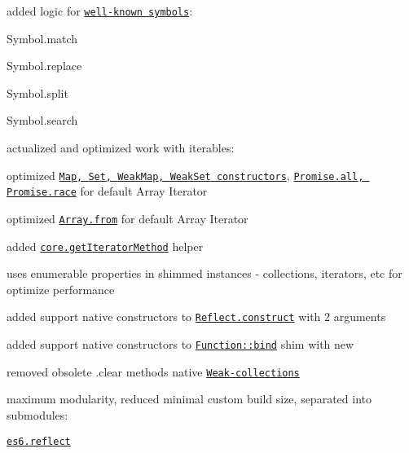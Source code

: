 \begin{DoxyItemize}
\item added logic for \href{https://github.com/zloirock/core-js/#ecmascript-6-regexp}{\tt well-\/known symbols}\+:
\begin{DoxyItemize}
\item {\ttfamily Symbol.\+match}
\item {\ttfamily Symbol.\+replace}
\item {\ttfamily Symbol.\+split}
\item {\ttfamily Symbol.\+search}
\end{DoxyItemize}
\item actualized and optimized work with iterables\+:
\begin{DoxyItemize}
\item optimized \href{https://github.com/zloirock/core-js/#ecmascript-6-collections}{\tt {\ttfamily Map}, {\ttfamily Set}, {\ttfamily Weak\+Map}, {\ttfamily Weak\+Set} constructors}, \href{https://github.com/zloirock/core-js/#ecmascript-6-promise}{\tt {\ttfamily Promise.\+all}, {\ttfamily Promise.\+race}} for default {\ttfamily Array Iterator}
\item optimized \href{https://github.com/zloirock/core-js/#ecmascript-6-array}{\tt {\ttfamily Array.\+from}} for default {\ttfamily Array Iterator}
\item added \href{https://github.com/zloirock/core-js/#ecmascript-6-iterators}{\tt {\ttfamily core.\+get\+Iterator\+Method}} helper
\end{DoxyItemize}
\item uses enumerable properties in shimmed instances -\/ collections, iterators, etc for optimize performance
\item added support native constructors to \href{https://github.com/zloirock/core-js/#ecmascript-6-reflect}{\tt {\ttfamily Reflect.\+construct}} with 2 arguments
\item added support native constructors to \href{https://github.com/zloirock/core-js/#ecmascript-5}{\tt {\ttfamily Function\+::bind}} shim with {\ttfamily new}
\item removed obsolete {\ttfamily .clear} methods native \href{https://github.com/zloirock/core-js/#ecmascript-6-collections}{\tt {\ttfamily Weak}-\/collections}
\item maximum modularity, reduced minimal custom build size, separated into submodules\+:
\begin{DoxyItemize}
\item \href{https://github.com/zloirock/core-js/#ecmascript-6-reflect}{\tt {\ttfamily es6.\+reflect}}

\end{DoxyItemize}
\end{DoxyItemize}
